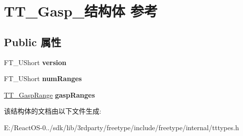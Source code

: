 \hypertarget{struct_t_t___gasp__}{}\section{T\+T\+\_\+\+Gasp\+\_\+结构体 参考}
\label{struct_t_t___gasp__}
\subsection*{Public 属性}
\begin{DoxyCompactItemize}
\item 
\mbox{\label{struct_t_t___gasp___a0166777999a11a32068418ed6cf0caf8}} 
F\+T\+\_\+\+U\+Short {\bfseries version}
\item 
\mbox{\label{struct_t_t___gasp___a03f6dc693ebee0fedc055ac0981ee776}} 
F\+T\+\_\+\+U\+Short {\bfseries num\+Ranges}
\item 
\mbox{\label{struct_t_t___gasp___a50240e84cfd7fc79ae1f2996ecb2a5d1}} 
\hyperlink{struct_t_t___gasp_range_rec__}{T\+T\+\_\+\+Gasp\+Range} {\bfseries gasp\+Ranges}
\end{DoxyCompactItemize}


该结构体的文档由以下文件生成\+:\begin{DoxyCompactItemize}
\item 
E\+:/\+React\+O\+S-\/0../sdk/lib/3rdparty/freetype/include/freetype/internal/tttypes.\+h\end{DoxyCompactItemize}
